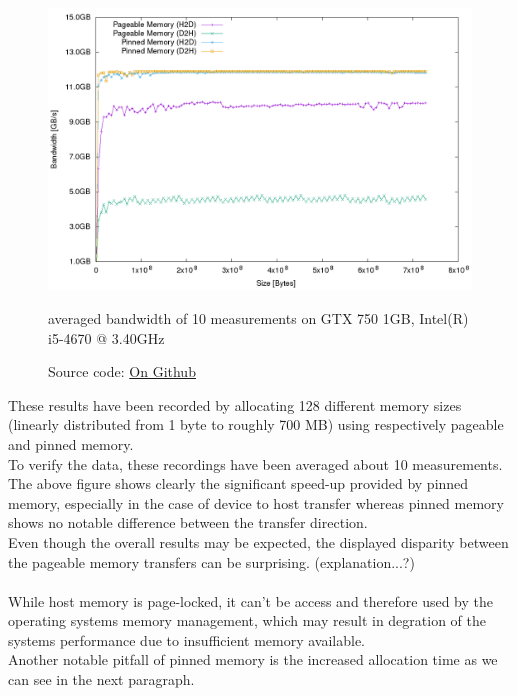 \begin{figure}[ht]
    \centering
    \includegraphics[scale=0.5]{media/bandwidth_pageable_vs_pinned_both.png}
    \caption{averaged bandwidth of 10 measurements on GTX 750 1GB, Intel(R) i5-4670 @ 3.40GHz}
    \caption*{Source code: \href{https://github.com/spotlight0xff/cuda\_paper/code/bandwidth}{On Github}}
    \label{fig:bandwidth}
\end{figure}
These results have been recorded by allocating 128 different memory sizes (linearly distributed from 1 byte to roughly 700 MB) using respectively pageable and pinned memory.\\
To verify the data, these recordings have been averaged about 10 measurements.\\
The above figure shows clearly the significant speed-up provided by pinned memory, especially in the case of device to host transfer
whereas pinned memory shows no notable difference between the transfer direction.\\
Even though the overall results may be expected, the displayed disparity between the pageable memory transfers can be surprising. (explanation...?)\\\\

While host memory is page-locked, it can't be access and therefore used by the operating systems memory management,
which may result in degration of the systems performance due to insufficient memory available.\\
Another notable pitfall of pinned memory is the increased allocation time as we can see in the next paragraph.\\
